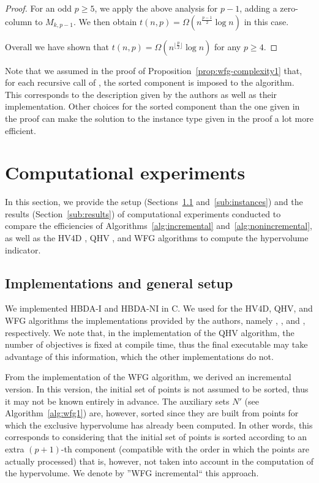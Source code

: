 \documentclass[a4paper,11pt]{article}
\begin{document}
\begin{proof}
For an odd $p \geq 5$, we apply the above analysis for $p-1$,
adding a zero-column to  $M_{k,p-1}$. 
We then obtain $t (n, p) = \Omega (n^{\frac{p-1}{2}} \log n)$ in this case.

Overall we have shown that $t (n, p) = \Omega (n^{\lfloor \frac{p}{2} \rfloor} \log n)$
for any $p\geq 4$.
\end{proof}



Note that we assumed in the proof of Proposition~\ref{prop:wfg-complexity1}
that, for each recursive call of {\WFG}, 
the sorted component is imposed to the algorithm.
This corresponds to the description given by the authors as well as their implementation.
Other choices for the sorted component than the one given in the proof
can make the solution 
to the instance type given in the proof a lot more efficient.


\section{Computational experiments}\label{sec:expe}

In this section, we provide the setup (Sections~\ref{sub:setup} and~\ref{sub:instances}) 
and the results (Section~\ref{sub:results}) of computational experiments
conducted to compare the efficiencies of Algorithms~\ref{alg:incremental} and~\ref{alg:nonincremental},
as well as the HV4D \citep{GueFonEmm12}, QHV \citep{RusFra14}, and WFG \citep{WhiBraBar12} algorithms
to compute the hypervolume indicator.

\subsection{Implementations and general setup}\label{sub:setup}

We implemented HBDA-I and HBDA-NI
in C.
We used for the HV4D, QHV, and WFG algorithms the implementations provided by the authors,
namely \citet[version 2.0 RC 2]{HV4D},  
\citet[retrieved on April, 2015]{QHV}, 
and \citet[version 1.10]{WFG}, respectively.
We note that, in the implementation of the QHV algorithm, 
the number of objectives is fixed at compile time,
thus the final executable may take advantage of this information,
which the other implementations do not.

From the implementation of the WFG algorithm, we derived an incremental version.
In this version, the initial set of points is not assumed to be sorted, 
thus it may not be known entirely in advance.
The auxiliary sets $N'$ (see Algorithm~\ref{alg:wfg1}) are, however, sorted 
since they are built from points for which the exclusive hypervolume has already been computed.
In other words, this corresponds to considering 
that the initial set of points is sorted according to an extra $(p+1)$-th 
component (compatible with the order in which the points are actually processed)
that is, however, not taken into account in the computation of the hypervolume.
We denote by ''WFG incremental`` this approach.
\end{document}
